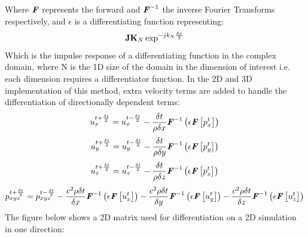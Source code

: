 Where $\textbf{\textit{F}}$ represents the forward and $\textbf{\textit{F}}^{-1}$ the inverse Fourier Transforms respectively, and $\epsilon$ is a differentiating function representing:\\
\begin{equation}
\textbf{JK}_N \exp^{-jk_N\frac{\delta x}{2}}\\
\end{equation}
Which is the impulse response of a differentiating function in the complex domain, where N is the 1D size of the domain in the dimension of interest i.e. each dimension requires a differentiator function. In the 2D and 3D implementation of this method, extra velocity terms are added to handle the differentiation of directionally dependent terms:\\
\begin{equation}
u^{t + \frac{\delta t}{2}}_{x} = u^{t - \frac{\delta t}{2}}_{x} - \frac{\delta t}{\rho \delta x} \textbf{\textit{F}}^{-1}\left(\epsilon \textbf{\textit{F}}\left[p^{t}_{x}\right] \right)\\
\end{equation}
\begin{equation}
u^{t + \frac{\delta t}{2}}_{y} = u^{t - \frac{\delta t}{2}}_{y} - \frac{\delta t}{\rho \delta y} \textbf{\textit{F}}^{-1}\left(\epsilon \textbf{\textit{F}}\left[p^{t}_{y}\right] \right)\\
\end{equation}
\begin{equation}
u^{t + \frac{\delta t}{2}}_{z} = u^{t - \frac{\delta t}{2}}_{z} - \frac{\delta t}{\rho \delta z} \textbf{\textit{F}}^{-1}\left(\epsilon \textbf{\textit{F}}\left[p^{t}_{z}\right] \right)\\
\end{equation}
\begin{equation}
p^{t + \frac{\delta t}{2}}_{xyz} = p^{t - \frac{\delta t}{2}}_{xyz} - \frac{c^2 \rho \delta t}{\delta x} \textbf{\textit{F}}^{-1}\left( \epsilon \textbf{\textit{F}} \left[ u_x^{t} \right] \right) - \frac{c^2 \rho \delta t}{\delta y} \textbf{\textit{F}}^{-1}\left( \epsilon \textbf{\textit{F}} \left[ u_y^{t} \right] \right) - \frac{c^2 \rho \delta t}{\delta z} \textbf{\textit{F}}^{-1}\left( \epsilon \textbf{\textit{F}} \left[ u_z^{t} \right] \right)\\
\end{equation}
The figure below shows a 2D matrix used for differentiation on a 2D simulation in one direction:\\
